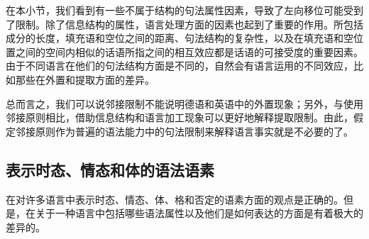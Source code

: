 在本小节，我们看到有一些不属于结构的句法属性因素，导致了左向移位可能受到了限制。除了信息结构的属性，语言处理方面的因素\label{Seite-Subjazenz-Performanz}也起到了重要的作用\citep*{Grosu73a,EC2000a,Gibson98a,KK93a,Hawkins99a,SHS2007a}。所包括成分的长度，填充语和空位之间的距离、句法结构的复杂性，以及在填充语和空位置之间的空间内相似的话语所指之间的相互效应都是话语的可接受度的重要因素。由于不同语言在他们的句法结构方面是不同的，自然会有语言运用的不同效应，比如那些在外置和提取方面的差异。

总而言之，我们可以说邻接限制不能说明德语和英语中的外置现象；另外，与使用邻接原则相比，借助信息结构和语言加工现象可以更好地解释提取限制。由此，假定邻接原则作为普遍的语法能力中的句法限制来解释语言事实就是不必要的了。

\subsection{表示时态、情态和体的语法语素}

 \citet[]{Pinker94a}在对许多语言中表示时态、情态、体、格和否定的语素方面的观点是正确的。但是，在关于一种语言中包括哪些语法属性以及他们是如何表达的方面是有着极大的差异的。

